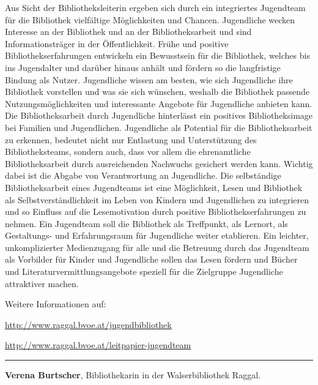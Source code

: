 \documentclass[a4paper,
fontsize=11pt,
oneside,
numbers=noperiodatend,
parskip=half-,
bibliography=totoc,
final
]{scrartcl}
\begin{document}
Aus Sicht der Bibliotheksleiterin ergeben sich durch ein integriertes
Jugendteam für die Bibliothek vielfältige Möglichkeiten und Chancen.
Jugendliche wecken Interesse an der Bibliothek und an der
Bibliotheksarbeit und sind Informationsträger in der Öffentlichkeit.
Frühe und positive Bibliothekserfahrungen entwickeln ein Bewusstsein für
die Bibliothek, welches bis ins Jugendalter und darüber hinaus anhält
und fördern so die langfristige Bindung als Nutzer. Jugendliche wissen
am besten, wie sich Jugendliche ihre Bibliothek vorstellen und was sie
sich wünschen, weshalb die Bibliothek passende Nutzungsmöglichkeiten und
interessante Angebote für Jugendliche anbieten kann. Die
Bibliotheksarbeit durch Jugendliche hinterlässt ein positives
Bibliotheksimage bei Familien und Jugendlichen. Jugendliche als
Potential für die Bibliotheksarbeit zu erkennen, bedeutet nicht nur
Entlastung und Unterstützung des Bibliotheksteams, sondern auch, dass
vor allem die ehrenamtliche Bibliotheksarbeit durch ausreichenden
Nachwuchs gesichert werden kann. Wichtig dabei ist die Abgabe von
Verantwortung an Jugendliche. Die selbständige Bibliotheksarbeit eines
Jugendteams ist eine Möglichkeit, Lesen und Bibliothek als
Selbstverständlichkeit im Leben von Kindern und Jugendlichen zu
integrieren und so Einfluss auf die Lesemotivation durch positive
Bibliothekserfahrungen zu nehmen. Ein Jugendteam soll die Bibliothek als
Treffpunkt, als Lernort, als Gestaltungs- und Erfahrungsraum für
Jugendliche weiter etablieren. Ein leichter, unkomplizierter
Medienzugang für alle und die Betreuung durch das Jugendteam als
Vorbilder für Kinder und Jugendliche sollen das Lesen fördern und Bücher
und Literaturvermittlungsangebote speziell für die Zielgruppe
Jugendliche attraktiver machen.

Weitere Informationen auf:

\url{http://www.raggal.bvoe.at/jugendbibliothek}

\url{http://www.raggal.bvoe.at/leitpapier-jugendteam}

\begin{center}\rule{0.5\linewidth}{\linethickness}\end{center}

\textbf{Verena Burtscher}, Bibliothekarin in der Walserbibliothek
Raggal.
\end{document}
